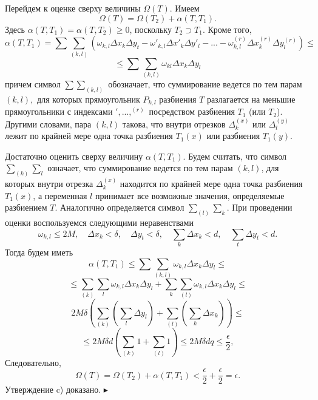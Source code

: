 \par\parindent=1cm Перейдем к оценке сверху величины $\Omega(T)$. Имеем $$\Omega(T)=\Omega(T_2)+\alpha(T,T_1).$$ Здесь $\alpha(T,T_1)=\alpha(T,T_2)\ge 0$, поскольку $T_2\supset T_1$. Кроме того, $$\alpha(T, T_1)=\sum\sum\limits_{(k,l)}{(\omega_{k,l}\Delta x_k \Delta y_t-\omega'_{k, l} \Delta x'_k\Delta y'_l-...-\omega^{(r)}_{k,l}\Delta x^{(r)}_k\Delta y^{(r)}_l)}\le$$ $$\le\sum\sum\limits_{(k,l)}{\omega_{kl} \Delta x_k \Delta y_l}$$ причем символ $\sum\sum\limits_{(k,l)}$ обозначает, что суммирование ведется по тем парам $(k,l),$ для которых прямоугольник $P_{k,l}$ разбиения $T$ разлагается на меньшие прямоугольники с индексами $',...,^{(r)}$ посредством разбиения $T_1$ (или $T_2$). Другими словами, пара $(k,l)$ такова, что внутри отрезков $\Delta^{(x)}_k$ или $\Delta^{(y)}_l$ лежит по крайней мере одна точка разбиения $T_1(x)$ или разбиения $T_1(y)$.
\par\parindent=1cm Достаточно оценить сверху величину $\alpha(T, T_1)$. Будем считать, что символ $\sum\limits_{(k)}\sum\limits_l$ означает, что суммирование ведется по тем парам $(k,l)$, для которых внутри отрезка $\Delta^{(x)}_k$ находится по крайней мере одна точка разбиения $T_1(x)$, а переменная $l$ принимает все возможные значения, определяемые разбиением $T$. Аналогично определяется символ $\sum\limits_{(l)}\sum\limits_k.$ При проведении оценки воспользуемся следующими неравенствами $$\omega_{k,l}\le 2M,\quad \Delta x_k<\delta,\quad \Delta y_t<\delta,\quad \sum\limits_k{\Delta x_k}<d,\quad \sum\limits_t{\Delta y_t}<d.$$ Тогда будем иметь
$$\alpha(T, T_1)\le \sum\sum\limits_{(k,l)}{\omega_{k,l}\Delta x_k\Delta y_l\le}$$
$$\le \sum\limits_{(k)}\sum\limits_l{\omega_{k,l}\Delta x_k\Delta y_l}+\sum\limits_k\sum\limits_{(l)}{\omega_{k,l}\Delta x_k\Delta y_l}\le$$
$$2M\delta\left(\sum\limits_{(k)}\left(\sum\limits_l{\Delta y_l}\right)+\sum\limits_{(l)}\left(\sum\limits_k{\Delta x_k}\right)\right)\le$$
$$\le 2M\delta d\left (\sum\limits_{(k)}1+\sum\limits_{(l)}1\right)\le 2M\delta dq\le \frac{\epsilon}{2},$$
Следовательно, $$\Omega(T)=\Omega(T_2)+\alpha(T, T_1)<\frac{\epsilon}{2}+\frac{\epsilon}{2}=\epsilon.$$ Утверждение c) доказано. $\blacktriangleright$
